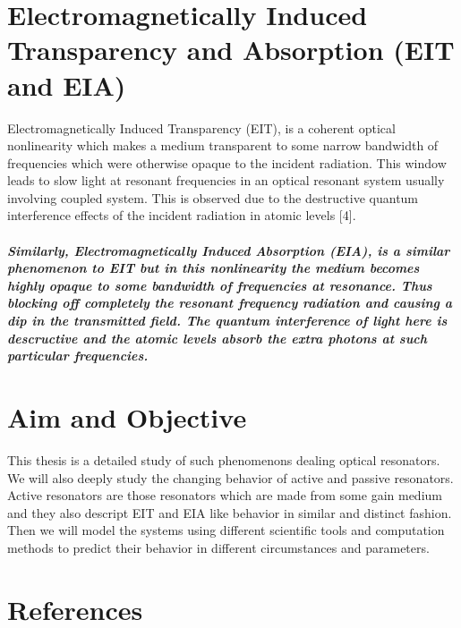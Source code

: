 \section{Electromagnetically Induced Transparency and Absorption (EIT and EIA)}
Electromagnetically Induced Transparency (EIT), is a coherent optical nonlinearity which makes a medium transparent to some narrow bandwidth of frequencies which were otherwise opaque to the incident radiation. This window leads to slow light at resonant frequencies in an optical resonant system usually involving coupled system. This is observed due to the destructive quantum interference effects of the incident radiation in atomic levels [4].

\subparagraph{\normalfont \large Similarly, Electromagnetically Induced Absorption (EIA), is a similar phenomenon to EIT but in this nonlinearity the medium becomes highly opaque to some bandwidth of frequencies at resonance. Thus blocking off completely the resonant frequency radiation and causing a dip in the transmitted field. The quantum interference of light here is descructive and the atomic levels absorb the extra photons at such particular frequencies. }

\section{Aim and Objective}
This thesis is a detailed study of such phenomenons dealing optical resonators. We will also deeply study the changing behavior of active and passive resonators. Active resonators are those resonators which are made from some gain medium and they also descript EIT and EIA like behavior in similar and distinct fashion. Then we will model the systems using different scientific tools and computation methods to predict their behavior in different circumstances and parameters. 


\newpage
\section*{References}

